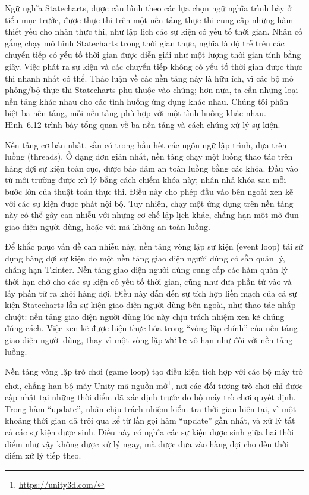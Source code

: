 Ngữ nghĩa Statecharts, được cấu hình theo các lựa chọn ngữ nghĩa trình bày ở tiểu mục trước, được thực thi trên một nền tảng thực thi cung cấp những hàm thiết yếu cho nhân thực thi, như lập lịch các sự kiện có yếu tố thời gian. Nhân cố gắng chạy mô hình Statecharts trong thời gian thực, nghĩa là độ trễ trên các chuyển tiếp có yếu tố thời gian được diễn giải như một lượng thời gian tính bằng giây. Việc phát ra sự kiện và các chuyển tiếp không có yếu tố thời gian được thực thi nhanh nhất có thể. Thảo luận về các nền tảng này là hữu ích, vì các bộ mô phỏng/bộ thực thi Statecharts phụ thuộc vào chúng; hơn nữa, ta cần những loại nền tảng khác nhau cho các tình huống ứng dụng khác nhau. Chúng tôi phân biệt ba nền tảng, mỗi nền tảng phù hợp với một tình huống khác nhau. Hình~6.12 trình bày tổng quan về ba nền tảng và cách chúng xử lý sự kiện.

Nền tảng cơ bản nhất, sẵn có trong hầu hết các ngôn ngữ lập trình, dựa trên luồng (threads). Ở dạng đơn giản nhất, nền tảng chạy một luồng thao tác trên hàng đợi sự kiện toàn cục, được bảo đảm an toàn luồng bằng các khóa. Đầu vào từ môi trường được xử lý bằng cách chiếm khóa này; nhân nhả khóa sau mỗi bước lớn của thuật toán thực thi. Điều này cho phép đầu vào bên ngoài xen kẽ với các sự kiện được phát nội bộ. Tuy nhiên, chạy một ứng dụng trên nền tảng này có thể gây can nhiễu với những cơ chế lập lịch khác, chẳng hạn một mô-đun giao diện người dùng, hoặc với mã không an toàn luồng.

Để khắc phục vấn đề can nhiễu này, nền tảng vòng lặp sự kiện (event loop) tái sử dụng hàng đợi sự kiện do một nền tảng giao diện người dùng có sẵn quản lý, chẳng hạn Tkinter. Nền tảng giao diện người dùng cung cấp các hàm quản lý thời hạn chờ cho các sự kiện có yếu tố thời gian, cũng như đưa phần tử vào và lấy phần tử ra khỏi hàng đợi. Điều này dẫn đến sự tích hợp liền mạch của cả sự kiện Statecharts lẫn sự kiện giao diện người dùng bên ngoài, như thao tác nhấp chuột: nền tảng giao diện người dùng lúc này chịu trách nhiệm xen kẽ chúng đúng cách.
Việc xen kẽ được hiện thực hóa trong ``vòng lặp chính'' của nền tảng giao diện người dùng, thay vì một vòng lặp \texttt{while} vô hạn như đối với nền tảng luồng.

Nền tảng vòng lặp trò chơi (game loop) tạo điều kiện tích hợp với các bộ máy trò chơi, chẳng hạn bộ máy Unity mã nguồn mở\footnote{\url{https://unity3d.com/}}, nơi các đối tượng trò chơi chỉ được cập nhật tại những thời điểm đã xác định trước do bộ máy trò chơi quyết định. Trong hàm ``update'', nhân chịu trách nhiệm kiểm tra thời gian hiện tại, vì một khoảng thời gian đã trôi qua kể từ lần gọi hàm ``update'' gần nhất, và xử lý tất cả các sự kiện được sinh. Điều này có nghĩa các sự kiện được sinh giữa hai thời điểm như vậy không được xử lý ngay, mà được đưa vào hàng đợi cho đến thời điểm xử lý tiếp theo.

